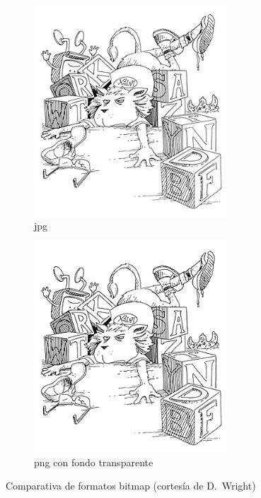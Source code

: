 \documentclass[11pt,a4paper]{article}
\begin{document}
\begin{figure}[H]
	\centering
  	\begin{subfigure}[b]{0.4\textwidth}
  		\centering
		\includegraphics[width=0.8\textwidth]{../figs/lionL.jpg}
		\caption{jpg}\label{fig:lionLjpg}
  	\end{subfigure}
  	\begin{subfigure}[b]{0.4\textwidth}
  		\centering
		\includegraphics[width=0.8\textwidth]{../figs/lionL.png}
		\caption{png con fondo transparente}\label{fig:lionpng}
  	\end{subfigure}
  	\caption[Comparación jpg y png con transparencia]{Comparativa de formatos bitmap (cortesía de D.~Wright)}
	\label{fig:lion}
\end{figure}
\end{document}
